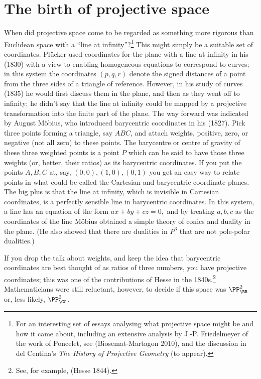 \section{The birth of projective space}
When did projective space come to be regarded as something more rigorous than Euclidean space with a ``line at infinity''?\footnote{For an interesting  set of essays analysing what projective space might be and how it came about, including an extensive analysis by J.-P. Friedelmeyer of the work of Poncelet, see (Biosemat-Martagon 2010), and the discussion in del Centina's \emph{The History of Projective Geometry} (to appear).}
 This might simply be a suitable set of coordinates. Pl\"ucker used coordinates for the plane with a line at infinity in his (1830) with a view to enabling homogeneous equations to correspond to curves; in this system the coordinates $(p, q, r)$ denote the signed distances of a point from the three sides of a triangle of reference. However, in his study of curves (1835) he would first discuss them in  the plane, and then as they went off to infinity; he didn't say that the line at infinity could be mapped by a projective transformation into the finite part of the plane.  The way forward was indicated by August M\"obius, who introduced barycentric coordinates in his (1827). Pick three points forming a triangle, say $ABC$, and attach weights, positive, zero, or negative (not all zero) to these points. The barycentre or centre of gravity of these three weighted points is a point $P$ which can be said to have those three weights (or, better, their ratios) as its barycentric coordinates. If you put the points $A, B, C$ at, say,  $(0, 0), (1, 0), (0, 1)$ you get an easy way to relate points in what could be called the Cartesian and barycentric coordinate planes. The big plus is that the line at infinity, which is invisible in Cartesian coordinates, is a perfectly sensible line in barycentric coordinates. In this system, a line has an equation of the form $ax+by+cz=0,$ and by treating $a, b, c$ as the coordinates of the line M\"obius obtained a simple theory of conics and duality in the plane. (He also showed that there are dualities in $P^3$ that are not pole-polar dualities.)

If you drop the talk about weights, and keep the idea that barycentric coordinates are best thought of as ratios of three numbers, you have projective coordinates; this was one of the contributions of Hesse in the 1840s.\footnote{See, for example, (Hesse 1844).}
Mathematicians were still reluctant, however, to decide if this space was $\PP_{\RR}^2$ or, less likely, $\PP_{\CC}^2$. 
 
